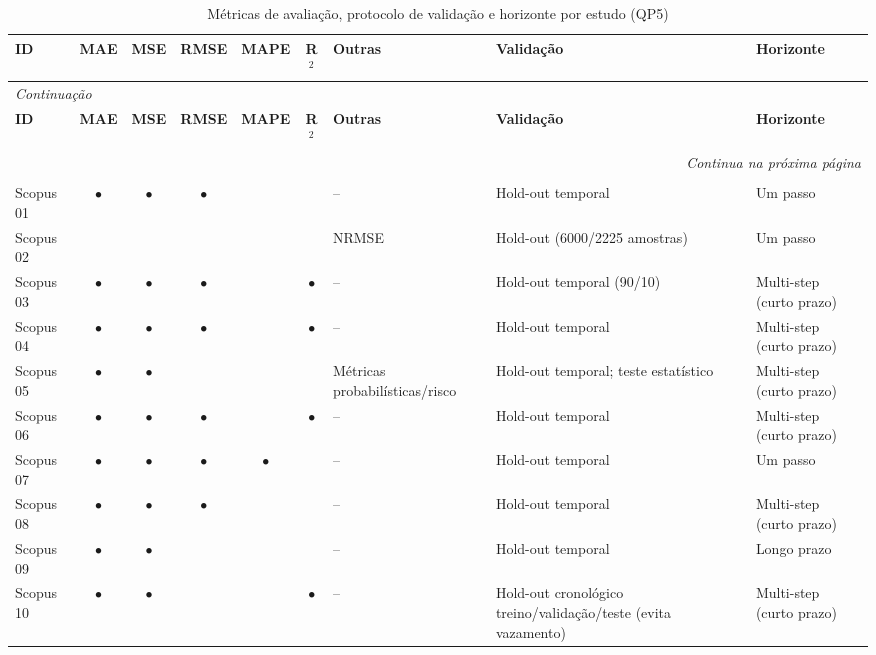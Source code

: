 {\footnotesize
\setlength{\tabcolsep}{3pt}
\renewcommand{\arraystretch}{1.15}
\begin{longtable}{p{1.3cm}ccccc p{2.0cm}p{3.2cm}p{2.0cm}}
\caption{Métricas de avaliação, protocolo de validação e horizonte por estudo (QP5)}\label{tab:map-metricas}\\
\toprule
\textbf{ID} & \textbf{MAE} & \textbf{MSE} & \textbf{RMSE} & \textbf{MAPE} & \textbf{R$^2$} & \textbf{Outras} & \textbf{Validação} & \textbf{Horizonte} \\
\midrule
\endfirsthead
\multicolumn{9}{l}{\textit{Continuação}}\\
\toprule
\textbf{ID} & \textbf{MAE} & \textbf{MSE} & \textbf{RMSE} & \textbf{MAPE} & \textbf{R$^2$} & \textbf{Outras} & \textbf{Validação} & \textbf{Horizonte} \\
\midrule
\endhead
\midrule
\multicolumn{9}{r}{\textit{Continua na próxima página}}\\
\endfoot
\bottomrule
\multicolumn{9}{l}{Fonte: Elaborado pelo autor (2026).}\\
\endlastfoot
Scopus 01 & $\bullet$ & $\bullet$ & $\bullet$ &  &  & -- & Hold-out temporal & Um passo \\
Scopus 02 &  &  &  &  &  & NRMSE & Hold-out (6000/2225 amostras) & Um passo \\
Scopus 03 & $\bullet$ & $\bullet$ & $\bullet$ &  & $\bullet$ & -- & Hold-out temporal (90/10) & Multi-step (curto prazo) \\
Scopus 04 & $\bullet$ & $\bullet$ & $\bullet$ &  & $\bullet$ & -- & Hold-out temporal & Multi-step (curto prazo) \\
Scopus 05 & $\bullet$ & $\bullet$ &  &  &  & Métricas probabilísticas/risco & Hold-out temporal; teste estatístico & Multi-step (curto prazo) \\
Scopus 06 & $\bullet$ & $\bullet$ & $\bullet$ &  & $\bullet$ & -- & Hold-out temporal & Multi-step (curto prazo) \\
Scopus 07 & $\bullet$ & $\bullet$ & $\bullet$ & $\bullet$ &  & -- & Hold-out temporal & Um passo \\
Scopus 08 & $\bullet$ & $\bullet$ & $\bullet$ &  &  & -- & Hold-out temporal & Multi-step (curto prazo) \\
Scopus 09 & $\bullet$ & $\bullet$ &  &  &  & -- & Hold-out temporal & Longo prazo \\
Scopus 10 & $\bullet$ & $\bullet$ &  &  & $\bullet$ & -- & Hold-out cronológico treino/validação/teste (evita vazamento) & Multi-step (curto prazo) \\

\end{longtable}}
